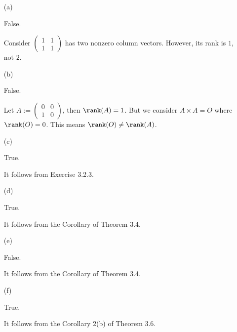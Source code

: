\begin{Exercise}
	\begin{enumerate}[(a)]
		\item[(a)]
		\begin{answer}
			False.
		\end{answer}
		\begin{solution}
			Consider $\begin{pmatrix}
			1 & 1 \\
			1 & 1
			\end{pmatrix}$ has two nonzero column vectors. However, its rank is $1$, not $2$.
		\end{solution}
		
		\item[(b)]
		\begin{answer}
			False.
		\end{answer}
		\begin{solution}
			Let $A := \begin{pmatrix}
			0 & 0 \\
			1 & 0
			\end{pmatrix}$, then $\rank(A) = 1$. But we consider $A\times A = O$ where $\rank(O) = 0$. This means $\rank(O)\neq \rank(A)$.
		\end{solution}
		
		\item[(c)]
		\begin{answer}
			True.
		\end{answer}
		\begin{solution}
			It follows from Exercise 3.2.3.
		\end{solution}
		
		\item[(d)]
		\begin{answer}
			True.
		\end{answer}
		\begin{solution}
			It follows from the Corollary of Theorem 3.4.
		\end{solution}
		
		\item[(e)]
		\begin{answer}
			False.
		\end{answer}
		\begin{solution}
			It follows from the Corollary of Theorem 3.4.
		\end{solution}
		
		\item[(f)]
		\begin{answer}
			True.
		\end{answer}
		\begin{solution}
			It follows from the Corollary 2(b) of Theorem 3.6.
		\end{solution}
		

\end{enumerate}
\end{Exercise}
